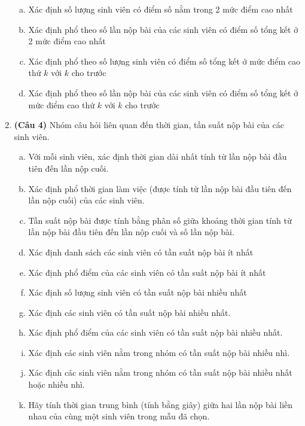 \documentclass[12pt,a4paper]{article}  %
\begin{document}
\begin{enumerate}
\begin{enumerate}[a)]
  \item {Xác định số lượng sinh viên có điểm số nằm trong 2 mức điểm cao nhất}
  \item {Xác định phổ theo số lần nộp bài của các sinh viên có điểm số tổng kết ở 2 mức điểm cao nhất}
  \item {Xác định phổ theo số lượng sinh viên có điểm số tổng kết ở mức điểm cao thứ $k$ với $k$ cho trước}
  \item {Xác định phổ theo số lần nộp bài của các sinh viên có điểm số tổng kết ở mức điểm cao thứ $k$ với $k$ cho trước}
    
\end{enumerate}

    
    

\item {\textbf{(Câu 4)} Nhóm câu hỏi liên quan đến thời gian, tần suất nộp bài của các sinh viên.} 
\begin{enumerate}[a)]
  \item {Với mỗi sinh viên, xác định thời gian dài nhất tính từ lần nộp bài đầu tiên đến lần nộp cuối.}
  \item {Xác định phổ thời gian làm việc (được tính từ lần nộp bài đầu tiên đến lần nộp cuối) của các sinh viên.}
  \item {Tần suất nộp bài được tính bằng phân số giữa khoảng thời gian tính từ lần nộp bài đầu tiên đến lần nộp cuối và số lần nộp bài.}
  \item {Xác định danh sách các sinh viên có tần suất nộp bài ít nhất}
  \item {Xác định phổ điểm của các sinh viên có tần suất nộp bài ít nhất}
  \item {Xác định số lượng sinh viên có tần suất nộp bài nhiều nhất}
  \item {Xác định các sinh viên có tần suất nộp bài nhiều nhất.}
  \item {Xác định phổ điểm của các sinh viên có tần suất nộp bài nhiều nhất.}
  \item {Xác định các sinh viên nằm trong nhóm có tần suất nộp bài nhiều nhì.}
  \item {Xác định các sinh viên nằm trong nhóm có tần suất  nộp bài nhiều nhất hoặc nhiều nhì.}

  
  \item Hãy tính thời gian trung bình (tính bằng giây) giữa hai lần nộp bài liền nhau của cùng một sinh viên trong mẫu đã chọn.


\end{enumerate}
\end{enumerate}
\end{document}
